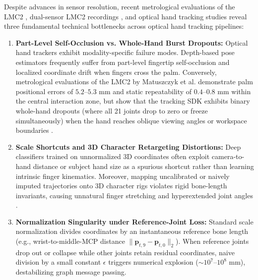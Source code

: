 \documentclass[10pt,twocolumn]{article}
\begin{document}
Despite advances in sensor resolution, recent metrological evaluations of the LMC2 \cite{matuszczyk2025lmc2}, dual-sensor LMC2 recordings \cite{gilmartin2024duallmc2}, and optical hand tracking studies \cite{boulahia2017dynamic, kumar2018position, liu2024novel} reveal three fundamental technical bottlenecks across optical hand tracking pipelines:
\begin{enumerate}
    \item \textbf{Part-Level Self-Occlusion vs. Whole-Hand Burst Dropouts:} Optical hand trackers exhibit modality-specific failure modes. Depth-based pose estimators \cite{de2017shrec, kumar2018position} frequently suffer from part-level fingertip self-occlusion and localized coordinate drift when fingers cross the palm. Conversely, metrological evaluations of the LMC2 by Matuszczyk et al. \cite{matuszczyk2025lmc2} demonstrate palm positional errors of $5.2\text{--}5.3\text{ mm}$ and static repeatability of $0.4\text{--}0.8\text{ mm}$ within the central interaction zone, but show that the tracking SDK exhibits binary whole-hand dropouts (where all 21 joints drop to zero or freeze simultaneously) when the hand reaches oblique viewing angles or workspace boundaries \cite{boulahia2017dynamic, matuszczyk2025lmc2}.
    \item \textbf{Scale Shortcuts and 3D Character Retargeting Distortions:} Deep classifiers trained on unnormalized 3D coordinates often exploit camera-to-hand distance or subject hand size as a spurious shortcut rather than learning intrinsic finger kinematics. Moreover, mapping uncalibrated or naively imputed trajectories onto 3D character rigs violates rigid bone-length invariants, causing unnatural finger stretching and hyperextended joint angles \cite{noiumkar2013use}.
    \item \textbf{Normalization Singularity under Reference-Joint Loss:} Standard scale normalization divides coordinates by an instantaneous reference bone length (e.g., wrist-to-middle-MCP distance $\|\mathbf{p}_{t,9} - \mathbf{p}_{t,0}\|_2$). When reference joints drop out or collapse while other joints retain residual coordinates, naive division by a small constant $\epsilon$ triggers numerical explosion ($\sim 10^7\text{--}10^8\text{ mm}$), destabilizing graph message passing.
\end{enumerate}
\end{document}
